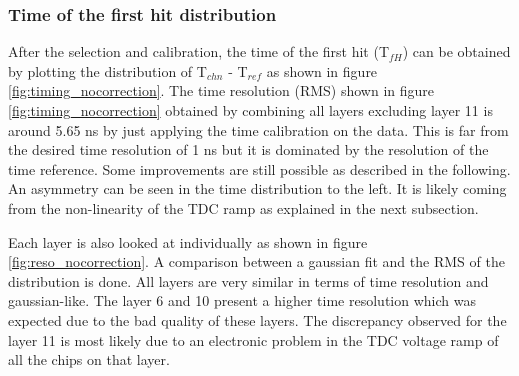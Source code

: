 \subsubsection{Time of the first hit distribution}

After the selection and calibration, the time of the first hit (T$_{fH}$) can be obtained by plotting the distribution of T$_{chn}$ - T$_{ref}$ as shown in figure \ref{fig:timing_nocorrection}. The time resolution (RMS) shown in figure \ref{fig:timing_nocorrection} obtained by combining all layers excluding layer 11 is around 5.65 ns by just applying the time calibration on the data. This is far from the desired time resolution of 1 ns but it is dominated by the resolution of the time reference. Some improvements are still possible as described in the following. An asymmetry can be seen in the time distribution to the left. It is likely coming from the non-linearity of the TDC ramp as explained in the next subsection.

Each layer is also looked at individually as shown in figure \ref{fig:reso_nocorrection}. A comparison between a gaussian fit and the RMS of the distribution is done. All layers are very similar in terms of time resolution and gaussian-like. The layer 6 and 10 present a higher time resolution which was expected due to the bad quality of these layers. The discrepancy observed for the layer 11 is most likely due to an electronic problem in the TDC voltage ramp of all the chips on that layer.

